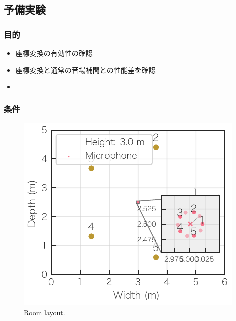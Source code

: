 \documentclass[twocolumn,9pt,dvipdfmx]{article}
\begin{document}
\subsection*{予備実験}
\subsubsection*{目的}
\begin{itemize}
  \item 座標変換の有効性の確認
  \item 座標変換と通常の音場補間との性能差を確認
  \item 
\end{itemize}

\subsubsection*{条件}
\begin{figure}[t]
  \centering
  \includegraphics{figures/room_layout.pdf}
  \caption{Room layout.}%
  \label{fig:layout}
\end{figure}
\end{document}
